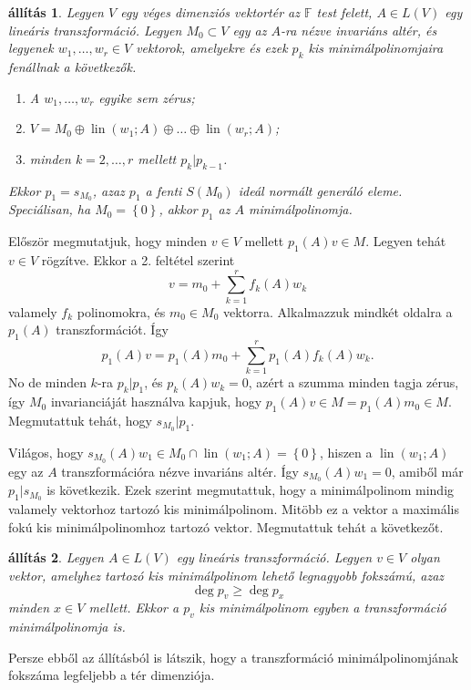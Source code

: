 \documentclass[a4paper, showtrims]{memoir}
\makeatletter
\renewenvironment{proof}[1][\proofname]
    {\par\pushQED{\qed}%
    \normalfont \topsep6\p@\@plus6\p@\relax
    \trivlist
    \item[\hskip\labelsep
        \itshape
    #1\@addpunct{:}]\ignorespaces}
    {\popQED\endtrivlist\@endpefalse}
\theoremstyle{plain}
\newtheorem{proposition}{állítás}[chapter]
\theoremstyle{remark}
\theoremstyle{definition}
\DeclareMathOperator{\lin}{lin}
\makeatother
\begin{document}
\begin{proposition}
    Legyen $V$ egy véges dimenziós vektortér az $\mathbb{F}$ test felett, $A\in L\left( V \right)$ egy lineáris transzformáció.
    Legyen $M_0\subset V$ egy az $A$-ra nézve invariáns altér, 
    és legyenek $w_1,\dots,w_r\in V$ vektorok, amelyekre és ezek $p_k$ kis minimálpolinomjaira
    fenállnak a következők.
    \begin{enumerate}
        \item A $w_1,\dots,w_r$ egyike sem zérus;
        \item $V=M_0\oplus\lin\left( w_1;A \right)\oplus\ldots\oplus\lin\left( w_r;A \right)$;
        \item minden $k=2,\dots,r$ mellett $p_k|p_{k-1}$.
    \end{enumerate}
    Ekkor $p_1=s_{M_0}$, azaz $p_1$ a fenti $S\left( M_0 \right)$ ideál normált generáló eleme.
    Speciálisan, ha $M_0=\left\{ 0 \right\}$, akkor $p_1$ az $A$ minimálpolinomja.
\end{proposition}
\begin{proof}
    Először megmutatjuk, hogy minden $v\in V$ mellett $p_1\left( A \right)v\in M$.
    Legyen tehát $v\in V$ rögzítve. 
    Ekkor a 2. feltétel szerint
    \[
        v=m_0+\sum_{k=1}^rf_k\left( A \right)w_k
    \]
    valamely $f_k$ polinomokra, és $m_0\in M_0$ vektorra.
    Alkalmazzuk mindkét oldalra a $p_1\left( A \right)$ transzformációt.
    Így
    \[
        p_1\left( A \right)v=p_1\left( A \right)m_0+\sum_{k=1}^rp_1\left( A \right)f_k\left( A \right)w_k.
    \]
    No de minden $k$-ra $p_k|p_1$, és $p_k\left( A \right)w_k=0$, azért a szumma minden tagja zérus,
    így $M_0$ invarianciáját használva kapjuk, hogy $p_1\left( A \right)v\in M=p_1\left( A \right)m_0\in M.$
    Megmutattuk tehát, hogy $s_{M_0}|p_1$.

    Világos, hogy $s_{M_0}\left( A \right)w_1\in M_0\cap\lin\left( w_1;A \right)=\left\{ 0 \right\}$,
    hiszen a $\lin\left( w_1;A \right)$ egy az $A$ transzformációra nézve invariáns altér.
    Így $s_{M_0}\left( A \right)w_1=0$, amiből már $p_1|s_{M_0}$ is következik.
\end{proof}
Ezek szerint megmutattuk, hogy a minimálpolinom mindig valamely vektorhoz tartozó kis minimálpolinom.
Mitöbb ez a vektor a maximális fokú kis minimálpolinomhoz tartozó vektor.
Megmutattuk tehát a következőt.
\begin{proposition}
    Legyen $A\in L\left( V \right)$ egy lineáris transzformáció. 
    Legyen $v\in V$ olyan vektor, amelyhez tartozó kis minimálpolinom lehető legnagyobb fokszámú,
    azaz
    \[
        \deg p_v\geq \deg p_x
    \]
    minden $x\in V$ mellett.
    Ekkor a $p_v$ kis minimálpolinom egyben a transzformáció minimálpolinomja is.
\end{proposition}
Persze ebből az állításból is látszik, hogy a transzformáció minimálpolinomjának fokszáma legfeljebb  a tér dimenziója.
\end{document}
